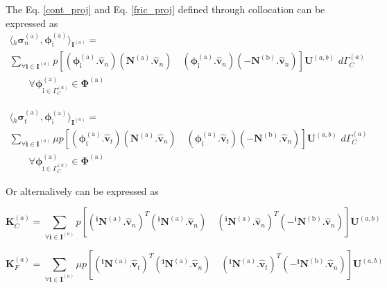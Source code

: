 The Eq. \eqref{cont_proj} and Eq. \eqref{fric_proj} defined through collocation can be expressed as\\

\begin{multline}\label{cont_proj1}
{\langle {}_h\bm{\sigma}^{\mathrm{(a)}}_n,  \bm \phi^{\mathrm{(a)}}_{\mathrm{i}} \rangle_{\bm I^{(a)}}} =\\
\sum_{\forall \bm i \in \bm I^{(a)}}p[( \bm \phi^{\mathrm{(a)}}_{\mathrm{i}} . \bm{\hat{v}}_n)(\bm N^{\mathrm{(a)}}.\bm{\hat{v}}_n) \quad( \bm \phi^{\mathrm{(a)}}_{\mathrm{i}} . \bm{\hat{v}}_n)(- \bm N^{\mathrm{(b)}}.\bm{\hat{v}}_n)] \bm U^{(a,b)} \,\, d\Gamma^{(a)}_C \\ \qquad \forall \bm \phi^{\mathrm{(a)}}_{\mathrm{i}\in \Gamma_C^{(a)}} \in \bm\Phi^{\mathrm{(a)}}  
\end{multline}

\begin{multline}\label{fric_proj1}
{\langle {}_h\bm{\sigma}^{\mathrm{(a)}}_t,  \bm \phi^{\mathrm{(a)}}_{\mathrm{i}} \rangle_{\bm I^{(a)}}} =\\
\sum_{\forall \bm i \in \bm I^{(a)}} \mu p[( \bm \phi^{\mathrm{(a)}}_{\mathrm{i}} . \bm{\hat{v}}_t)(\bm N^{\mathrm{(a)}}.\bm{\hat{v}}_n) \quad( \bm \phi^{\mathrm{(a)}}_{\mathrm{i}} . \bm{\hat{v}}_t)(- \bm N^{\mathrm{(b)}}.\bm{\hat{v}}_n)] \bm U^{(a,b)} \,\, d\Gamma^{(a)}_C \\ \qquad \forall \bm \phi^{\mathrm{(a)}}_{\mathrm{i}\in \Gamma_C^{(a)}} \in \bm\Phi^{\mathrm{(a)}}  
\end{multline}

Or alternalively can be expressed as

 \begin{equation}\label{cont_dis1}
\mathbf{K}^{(a)}_C=\sum_{\forall \bm i \in \bm I^{(a)}} p[({}^{\bm i} \bm N^{\mathrm{(a)}}.\bm{\hat{v}}_n)^T({}^{\bm i}\bm N^{\mathrm{(a)}}.\bm{\hat{v}}_n) \quad({}^{\bm i} \bm N^{\mathrm{(a)}}.\bm{\hat{v}}_n)^T(- {}^{\bm i} \bm N^{\mathrm{(b)}}.\bm{\hat{v}}_n)] \bm U^{(a,b)}
\end{equation}

\begin{equation}\label{fric_dis1}
\mathbf{K}^{(a)}_F=\sum_{\forall \bm i \in \bm I^{(a)}} \mu p[({}^{\bm i} \bm N^{\mathrm{(a)}}.\bm{\hat{v}}_t)^T({}^{\bm i}\bm N^{\mathrm{(a)}}.\bm{\hat{v}}_n) \quad({}^{\bm i} \bm N^{\mathrm{(a)}}.\bm{\hat{v}}_t)^T(- {}^{\bm i} \bm N^{\mathrm{(b)}}.\bm{\hat{v}}_n)] \bm U^{(a,b)}
\end{equation}\\

